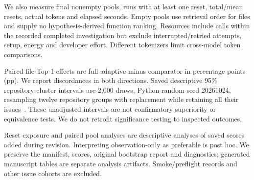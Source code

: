 We also measure final nonempty pools, runs with at least one reset, total/mean resets, actual tokens and elapsed seconds. Empty pools use retrieval order for files and supply no hypothesis-derived function ranking. Resources include calls within the recorded completed investigation but exclude interrupted/retried attempts, setup, energy and developer effort. Different tokenizers limit cross-model token comparisons.

Paired file-Top-1 effects are full adaptive minus comparator in percentage points (pp). We report discordances in both directions. Saved descriptive 95\% repository-cluster intervals use 2,000 draws, Python random seed 20261024, resampling twelve repository groups with replacement while retaining all their issues~\citep{efron1993,clusterbootstrap2007}. These unadjusted intervals are not confirmatory superiority or equivalence tests. We do not retrofit significance testing to inspected outcomes.

Reset exposure and paired pool analyses are descriptive analyses of saved scores added during revision. Interpreting observation-only as preferable is post hoc. We preserve the manifest, scores, original bootstrap report and diagnostics; generated manuscript tables are separate analysis artifacts. Smoke/preflight records and other issue cohorts are excluded.

